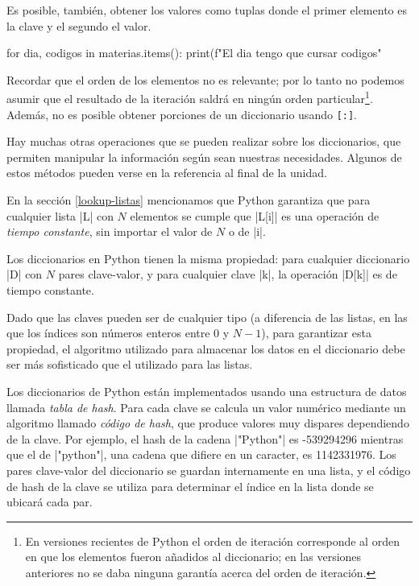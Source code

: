 Es posible, también, obtener los valores como tuplas donde el primer
elemento es la clave y el segundo el valor.

\begin{codigo-python-sn}
for dia, codigos in materias.items():
    print(f"El {dia} tengo que cursar {codigos}"
\end{codigo-python-sn}

Recordar que el orden de los elementos no es relevante; por lo tanto no podemos
asumir que el resultado de la iteración saldrá en ningún orden
particular\footnote{En versiones recientes de Python el orden de iteración
corresponde al orden en que los elementos fueron añadidos al diccionario; en
las versiones anteriores no se daba ninguna garantía acerca del orden de
iteración.}. Además, no es posible obtener porciones de un diccionario
usando \lstinline![:]!.

Hay muchas otras operaciones que se
pueden realizar sobre los diccionarios, que permiten manipular la información
según sean nuestras necesidades. Algunos de estos métodos pueden verse en
la referencia al final de la unidad.

\begin{sabias_que}
En la sección \ref{lookup-listas} mencionamos que Python garantiza que para
cualquier lista |L| con $N$ elementos se cumple que |L[i]| es una operación de
\emph{tiempo constante}, sin importar el valor de $N$ o de |i|.

Los diccionarios en Python tienen la misma propiedad: para cualquier
diccionario |D| con $N$ pares clave-valor, y para cualquier clave |k|, la
operación |D[k]| es de tiempo constante.

Dado que las claves pueden ser de cualquier tipo (a diferencia de las listas, en
las que los índices son números enteros entre 0 y $N-1$), para garantizar esta
propiedad, el algoritmo utilizado para almacenar los datos en el diccionario
debe ser más sofisticado que el utilizado para las listas.

Los diccionarios de Python están implementados usando una estructura de datos
llamada \emph{tabla de hash}. Para cada clave se calcula un valor numérico
mediante un algoritmo llamado \emph{código de hash}, que produce valores
muy dispares dependiendo de la clave.  Por ejemplo, el hash de la cadena
|"Python"| es -539294296 mientras que el de |"python"|, una cadena que
difiere en un caracter, es 1142331976. Los pares clave-valor del diccionario
se guardan internamente en una lista, y el código de hash de la clave se
utiliza para determinar el índice en la lista donde se ubicará cada par.
\end{sabias_que}

